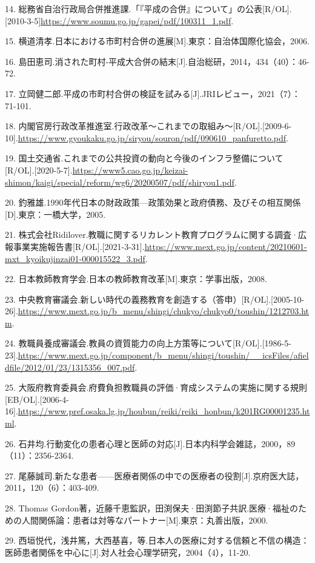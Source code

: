 14. 総務省自治行政局合併推進課.「『平成の合併』について」の公表[R/OL].\allowbreak{}[2010-3-5]\url{https://www.soumu.go.jp/gapei/pdf/100311_1.pdf}.

15. 横道清孝.日本における市町村合併の進展[M].東京：自治体国際化協会，2006.

16. 島田恵司.消された町村-平成大合併の結末[J].自治総研，2014，434（40）：46-72.

17. 立岡健二郎.平成の市町村合併の検証を試みる[J].JRIレビュー，2021（7）：71-101.

18. 内閣官房行政改革推進室.行政改革～これまでの取組み～[R/OL].\allowbreak{}[2009-6-10].\url{https://www.gyoukaku.go.jp/siryou/souron/pdf/090610_panfuretto.pdf}.

19. 国土交通省.これまでの公共投資の動向と今後のインフラ整備について[R/OL].\allowbreak{}[2020-5-7].\url{https://www5.cao.go.jp/keizai-shimon/kaigi/special/reform/wg6/20200507/pdf/shiryou1.pdf}.

20. 釣雅雄.1990年代日本の財政政策—政策効果と政府債務、及びその相互関係[D].東京：一橋大学，2005.

21. 株式会社Ridilover.教職に関するリカレント教育プログラムに関する調査·広報事業実施報告書[R/OL].\allowbreak{}[2021-3-31].\url{https://www.mext.go.jp/content/20210601-mxt_kyoikujinzai01-000015522_3.pdf}.

22. 日本教師教育学会.日本の教師教育改革[M].東京：学事出版，2008.

23. 中央教育審議会.新しい時代の義務教育を創造する（答申）[R/OL].\allowbreak{}[2005-10-26].\url{https://www.mext.go.jp/b_menu/shingi/chukyo/chukyo0/toushin/1212703.htm}.

24. 教職員養成審議会.教員の資質能力の向上方策等について[R/OL].\allowbreak{}[1986-5-23].\url{https://www.mext.go.jp/component/b_menu/shingi/toushin/__icsFiles/afieldfile/2012/01/23/1315356_007.pdf}.

25. 大阪府教育委員会.府費負担教職員の評価·育成システムの実施に関する規則[EB/OL].\allowbreak{}[2006-4-16].\url{https://www.pref.osaka.lg.jp/houbun/reiki/reiki_honbun/k201RG00001235.html}.

26. 石井均.行動変化の患者心理と医師の対応[J].日本内科学会雑誌，2000，89（11）：2356-2364.

27. 尾藤誠司.新たな患者——医療者関係の中での医療者の役割[J].京府医大誌，2011，120（6）：403-409.

28. Thomas Gordon著，近藤千恵監訳，田渕保夫·田渕節子共訳.医療·福祉のための人間関係論：患者は対等なパートナー[M].東京：丸善出版，2000.

29. 西垣悦代，浅井篤，大西基喜，等.日本人の医療に対する信頼と不信の構造：医師患者関係を中心に[J].対人社会心理学研究，2004（4），11-20.

